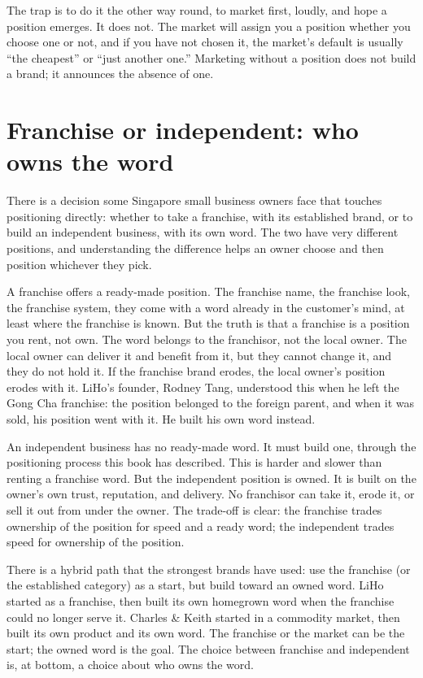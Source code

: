 \documentclass[10pt,twoside,openany]{memoir}
\newcommand{\needspacehead}{\needspace{4\baselineskip}}
\let\oldsection\section
\renewcommand{\section}{\needspacehead\oldsection}
\begin{document}
{The trap is to do it the other way round, to market first, loudly, and
hope a position emerges. It does not. The market will assign you a
position whether you choose one or not, and if you have not chosen it,
the market's default is usually ``the cheapest'' or ``just another
one.'' Marketing without a position does not build a brand; it announces
the absence of one.

\section{Franchise or independent: who owns the
word}\label{franchise-or-independent-who-owns-the-word}

There is a decision some Singapore small business owners face that
touches positioning directly: whether to take a franchise, with its
established brand, or to build an independent business, with its own
word. The two have very different positions, and understanding the
difference helps an owner choose and then position whichever they pick.

A franchise offers a ready-made position. The franchise name, the
franchise look, the franchise system, they come with a word already in
the customer's mind, at least where the franchise is known. But the
truth is that a franchise is a position you rent, not own. The word
belongs to the franchisor, not the local owner. The local owner can
deliver it and benefit from it, but they cannot change it, and they do
not hold it. If the franchise brand erodes, the local owner's position
erodes with it. LiHo's founder, Rodney Tang, understood this when he
left the Gong Cha franchise: the position belonged to the foreign
parent, and when it was sold, his position went with it. He built his
own word instead.

An independent business has no ready-made word. It must build one,
through the positioning process this book has described. This is harder
and slower than renting a franchise word. But the independent position
is owned. It is built on the owner's own trust, reputation, and
delivery. No franchisor can take it, erode it, or sell it out from under
the owner. The trade-off is clear: the franchise trades ownership of the
position for speed and a ready word; the independent trades speed for
ownership of the position.

There is a hybrid path that the strongest brands have used: use the
franchise (or the established category) as a start, but build toward an
owned word. LiHo started as a franchise, then built its own homegrown
word when the franchise could no longer serve it. Charles \& Keith
started in a commodity market, then built its own product and its own
word. The franchise or the market can be the start; the owned word is
the goal. The choice between franchise and independent is, at bottom, a
choice about who owns the word.

}
\end{document}
